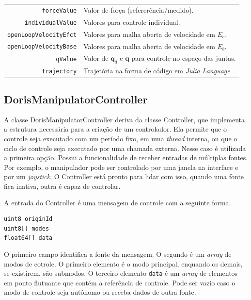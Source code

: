 \begin{table}[h!]
\begin{tabular}{rl}
\verb|forceValue|&			Valor de força (refererência/medido).\\
\verb|individualValue|&		Valores para controle individual.  \\
\verb|openLoopVelocityEfct|&Valores para malha aberta de velocidade em $E_e$. \\
\verb|openLoopVelocityBase|&Valores para malha aberta de velocidade em $E_b$. \\
\verb|qValue|&				Valor de $\bm{q}_d$ e $\bm{q}$ para controle no espaço das juntas.	\\
\verb|trajectory|&			Trajetória na forma de código em \textit{Julia Language}\\
\hline
\end{tabular}
\end{table}

\subsection{DorisManipulatorController}

A classe DorisManipulatorController deriva da classe Controller, que implementa a estrutura necessária para a criação de um controlador. Ela permite que o controle seja executado com um período fixo, em uma \textit{thread} interna, ou que o ciclo de controle seja executado por uma chamada externa. Nesse caso é utilizada a primeira opção. Possui a funcionalidade de receber entradas de múltiplas fontes. Por exemplo, o manipulador pode ser controlado por uma janela na interface e por um \textit{joystick}. O Controller está pronto para lidar com isso, quando uma fonte fica inativa, outra é capaz de controlar. 

A entrada do Controller é uma mensagem de controle com a seguinte forma.

\begin{lstlisting}[caption=Control.msg]
uint8 originId
uint8[] modes
float64[] data
\end{lstlisting}

O primeiro campo identifica a fonte da mensagem. O segundo é um \textit{array} de modos de cotrole. O primeiro elemento é o modo principal, enquando os demais, se existirem, são submodos. O terceiro elemento \verb|data| é um \textit{array} de elementos em ponto flutuante que contém a referência de controle. Pode ser vazio caso o modo de controle seja autônomo ou receba dados de outra fonte.

